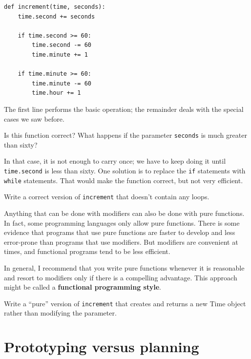 \documentclass[10pt]{book}
\begin{document}
\begin{CJK}{UTF8}{gbsn}
\begin{verbatim}
def increment(time, seconds):
    time.second += seconds

    if time.second >= 60:
        time.second -= 60
        time.minute += 1

    if time.minute >= 60:
        time.minute -= 60
        time.hour += 1
\end{verbatim}
%
The first line performs the basic operation; the remainder deals
with the special cases we saw before.

Is this function correct?  What happens if the parameter {\tt seconds}
is much greater than sixty?  

In that case, it is not enough to carry
once; we have to keep doing it until {\tt time.second} is less than sixty.
One solution is to replace the {\tt if} statements with {\tt while}
statements.  That would make the function correct, but not
very efficient.

\begin{exercise}

Write a correct version of {\tt increment} that
doesn't contain any loops.

\end{exercise}

Anything that can be done with modifiers can also be done with pure
functions.  In fact, some programming languages only allow pure
functions.  There is some evidence that programs that use pure
functions are faster to develop and less error-prone than programs
that use modifiers.  But modifiers are convenient at times,
and functional programs tend to be less efficient.

In general, I recommend that you write pure functions whenever it is
reasonable and resort to modifiers only if there is a compelling
advantage.  This approach might be called a {\bf functional
programming style}.


\begin{exercise}

Write a ``pure'' version of {\tt increment} that creates and returns
a new Time object rather than modifying the parameter.

\end{exercise}


\section{Prototyping versus planning}
\label{prototype}


\end{CJK}
\end{document}
